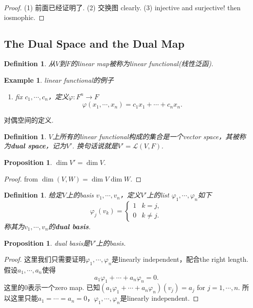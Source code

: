 \documentclass{article}
\newtheorem{proposition}[theorem]{Proposition}
\newtheorem{example}[theorem]{Example}
\newtheorem{definition}[theorem]{Definition}
\newcommand*{\xfunc}[4]{{#2}\colon{#3}{#1}{#4}}
\newcommand*{\func}[3]{\xfunc{\to}{#1}{#2}{#3}}
\begin{document}
\begin{proof}
(1) 前面已经证明了.
(2) 交换图 clearly.
(3) injective and surjective! then iosmophic.
\end{proof}

\newpage
\subsection{The Dual Space and the Dual Map}

\begin{definition}
\rm 从$V$到$F$的linear map被称为linear functional(线性泛函).
\end{definition}

\begin{example}
linear functional的例子
\begin{enumerate}
	\item fix $c_1,\cdots,c_n$，定义$\func{\varphi}{F^n}{F}$
	$$
		\varphi(x_1,\cdots,x_n) = c_1x_1+\cdots+c_nx_n.
	$$ 
\end{enumerate}
\end{example}

{\color{red} 对偶空间的定义}.

\begin{definition}
\rm $V$上所有的linear functional构成的集合是一个vector space，其被称为\textbf{dual space}，记为$V'$. 换句话说就是$V' = \mathcal{L}(V,F)$.
\end{definition}

\begin{proposition}	
$\dim V' = \dim V$.
\end{proposition}

\begin{proof}
from $\dim(V,W)=\dim V \dim W$.
\end{proof}

\begin{definition}
\rm 给定$V$上的basis $v_1,\cdots,v_n$，定义$V'$上的list $\varphi_1,\cdots,\varphi_n$如下
$$
\varphi_j(v_k)= \left\{ \begin{array}{cc}
1 & k=j, \\
0 & k\neq j.
\end{array} \right.
$$
称其为$v_1,\cdots,v_n$的\textbf{dual basis}.
\end{definition}

\begin{proposition}
\rm dual basis是$V'$上的basis.
\end{proposition}

\begin{proof}
这里我们只需要证明$\varphi_1,\cdots,\varphi_n$是linearly independent，配合the right length. 假设$a_1,\cdots,a_n$使得
$$
a_1\varphi_1 + \cdots + a_n\varphi_n=0.
$$
这里的$0$表示一个zero map. 已知$(a_1\varphi_1 + \cdots + a_n\varphi_n)(v_j) = a_j$ for $j = 1,\cdots,n$. 所以这里只能$a_1 = \cdots = a_n =0$，$\varphi_1,\cdots,\varphi_n$是linearly independent. 
\end{proof}
\end{document}
